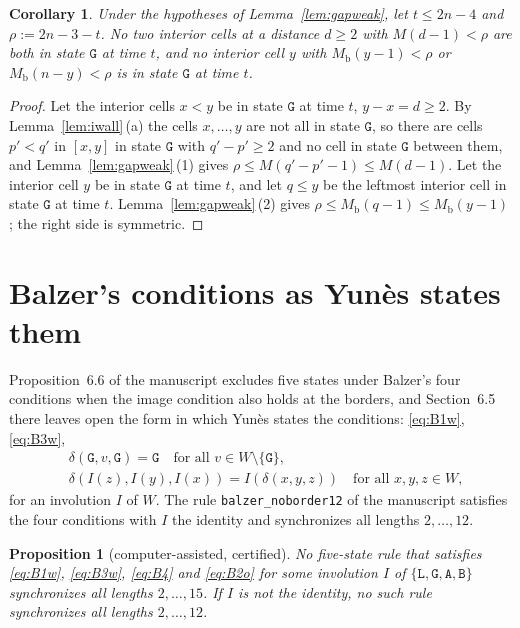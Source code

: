 \documentclass[11pt]{article}
\newtheorem{proposition}[lemma]{Proposition}
\newtheorem{corollary}[lemma]{Corollary}
\theoremstyle{remark}
\newcommand{\Lq}{\mathtt{L}}\newcommand{\Gq}{\mathtt{G}}\newcommand{\Aq}{\mathtt{A}}\newcommand{\Bq}{\mathtt{B}}\newcommand{\Fq}{\mathtt{F}}
\begin{document}
\begin{corollary}\label{cor:gapclauses}
Under the hypotheses of Lemma~\ref{lem:gapweak}, let $t\le2n-4$ and $\rho:=2n-3-t$. No two interior cells at a
distance $d\ge2$ with $M(d-1)<\rho$ are both in state $\Gq$ at time $t$, and no interior cell $y$ with
$M_{\mathrm b}(y-1)<\rho$ or $M_{\mathrm b}(n-y)<\rho$ is in state $\Gq$ at time $t$.
\end{corollary}
\begin{proof}
Let the interior cells $x<y$ be in state $\Gq$ at time $t$, $y-x=d\ge2$. By Lemma~\ref{lem:iwall}\,(a) the
cells $x,\dots,y$ are not all in state $\Gq$, so there are cells $p'<q'$ in $[x,y]$ in state $\Gq$ with
$q'-p'\ge2$ and no cell in state $\Gq$ between them, and Lemma~\ref{lem:gapweak}\,(1) gives
$\rho\le M(q'-p'-1)\le M(d-1)$. Let the interior cell $y$ be in state $\Gq$ at time $t$, and let $q\le y$ be
the leftmost interior cell in state $\Gq$ at time $t$. Lemma~\ref{lem:gapweak}\,(2) gives
$\rho\le M_{\mathrm b}(q-1)\le M_{\mathrm b}(y-1)$; the right side is symmetric.
\end{proof}

\section{Balzer's conditions as Yun\`es states them}\label{sec:yunes}

Proposition~6.6 of the manuscript excludes five states under Balzer's four conditions when the image
condition also holds at the borders, and Section~6.5 there leaves open the form in which Yun\`es states the
conditions: \eqref{eq:B1w}, \eqref{eq:B3w},
\begin{align}
&\delta(\Gq,v,\Gq)=\Gq\quad\text{for all }v\in W\setminus\{\Gq\}, \tag{B4}\label{eq:B4}\\
&\delta(I(z),I(y),I(x))=I(\delta(x,y,z))\quad\text{for all }x,y,z\in W, \tag{B2$^\circ$}\label{eq:B2o}
\end{align}
for an involution $I$ of $W$. The rule \texttt{balzer\_noborder12} of the manuscript satisfies the four
conditions with $I$ the identity and synchronizes all lengths $2,\dots,12$.

\begin{proposition}[computer-assisted, certified]\label{prop:yunes}
No five-state rule that satisfies \eqref{eq:B1w}, \eqref{eq:B3w}, \eqref{eq:B4} and \eqref{eq:B2o} for some
involution $I$ of $\{\Lq,\Gq,\Aq,\Bq\}$ synchronizes all lengths $2,\dots,15$. If $I$ is not the identity, no
such rule synchronizes all lengths $2,\dots,12$.
\end{proposition}
\end{document}
